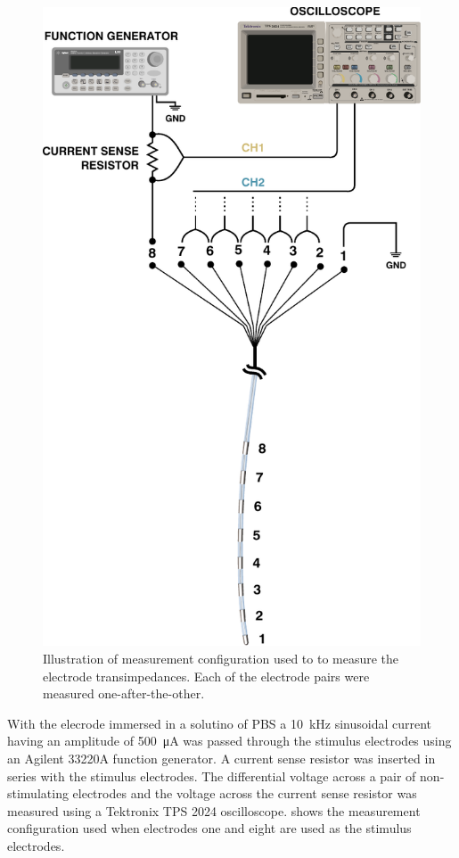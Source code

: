       \begin{figure}
        \centering
        \includegraphics{content/pt2/08-InterfaceParameters/graphics/measurement_resistorMesh}
        \caption{\label{fig:pt2-measurement_resistorMesh}Illustration of measurement configuration used to to measure the electrode transimpedances. Each of the electrode pairs were measured one-after-the-other.}
      \end{figure}


      With the elecrode immersed in a solutino of PBS a \SI{10}{\kilo\hertz} sinusoidal current having an amplitude of \SI{500}{\micro\ampere} was passed through the stimulus electrodes using an Agilent 33220A function generator.
      A current sense resistor was inserted in series with the stimulus electrodes.
      The differential voltage across a pair of non-stimulating electrodes and the voltage across the current sense resistor was measured using a Tektronix TPS 2024 oscilloscope.
       shows the measurement configuration used when electrodes one and eight are used as the stimulus electrodes.

